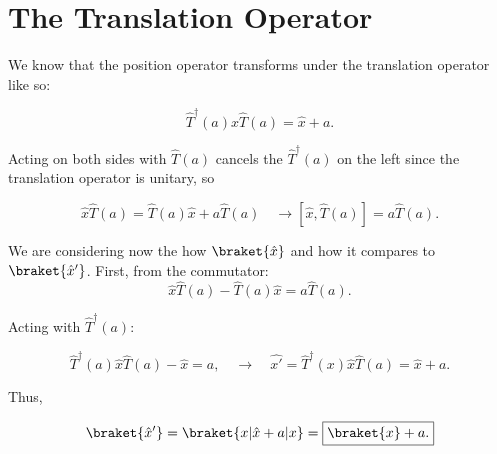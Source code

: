 \section{The Translation Operator}

\begin{parts}
\item We know that the position operator transforms under the translation operator like so:

  \begin{equation}
    \hat{T}^\dagger(a) \hat{x} \hat{T}(a) = \hat{x} + a.
  \end{equation}

  Acting on both sides with $\hat{T}(a)$ cancels the $\hat{T}^\dagger(a)$ on the left since the translation operator is unitary, so

  \begin{equation}
    \hat{x} \hat{T}(a) = \hat{T}(a)\hat{x} + a\hat{T}(a) \quad\rightarrow \boxed{[\hat{x},\hat{T}(a)] = a\hat{T}(a).}
  \end{equation}


\item We are considering now the how $\braket{\hat{x}}$ and how it compares to $\braket{\hat{x}'}$. First, from the commutator:
  \begin{equation}
    \hat{x}\hat{T}(a) - \hat{T}(a)\hat{x} = a\hat{T}(a).
  \end{equation}
  
  Acting with $\hat{T}^\dagger (a)$:
  
  \begin{equation}
    \hat{T}^\dagger (a)\hat{x}\hat{T}(a) - \hat{x} = a, \quad\rightarrow\quad \hat{x'} = \hat{T}^\dagger(x)\hat{x}\hat{T}(a) = \hat{x} + a.
  \end{equation}

  Thus, 

  \begin{equation}
    \braket{\hat{x}'} = \braket{x | \hat{x} + a | x} = \boxed{\braket{x} + a.}
  \end{equation}
  
\end{parts}

